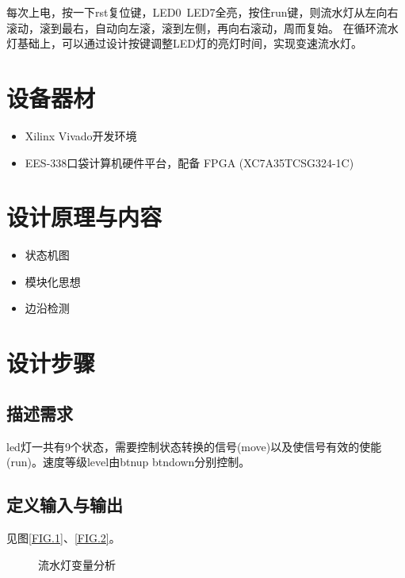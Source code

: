\documentclass[UTF8]{article}
\begin{document}
每次上电，按一下rst复位键，LED0~LED7全亮，按住run键，则流水灯从左向右滚动，滚到最右，自动向左滚，滚到左侧，再向右滚动，周而复始。
在循环流水灯基础上，可以通过设计按键调整LED灯的亮灯时间，实现变速流水灯。


\section{设备器材}
\begin{itemize}
    \item Xilinx Vivado开发环境
    \item EES-338口袋计算机硬件平台，配备 FPGA (XC7A35TCSG324-1C)
\end{itemize}



\section{设计原理与内容}

\begin{itemize}
    \item 状态机图
    \item 模块化思想
    \item 边沿检测
\end{itemize}



\section{设计步骤}
\subsection{描述需求}

led灯一共有9个状态，需要控制状态转换的信号(move)以及使信号有效的使能(run)。速度等级level由btnup btndown分别控制。

\subsection{定义输入与输出}

见图\ref{FIG.1}、\ref{FIG.2}。

\begin{figure}[H]
    \centering
    \caption{流水灯变量分析}
\end{figure}
\end{document}
